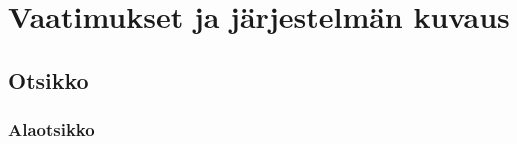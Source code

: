 \chapter{Vaatimukset ja järjestelmän kuvaus} %
\label{kuvaus} %
\thispagestyle{fancy} %

\section{Otsikko}  %

\lipsum

\subsection{Alaotsikko}

\lipsum[1-3]